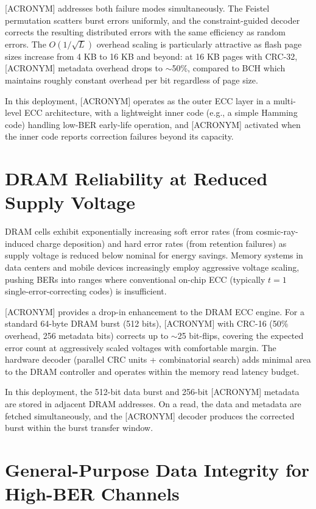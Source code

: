[ACRONYM] addresses both failure modes simultaneously. The Feistel permutation scatters burst errors uniformly, and the constraint-guided decoder corrects the resulting distributed errors with the same efficiency as random errors. The $O(1/\sqrt{L})$ overhead scaling is particularly attractive as flash page sizes increase from 4 KB to 16 KB and beyond: at 16 KB pages with CRC-32, [ACRONYM] metadata overhead drops to $\sim$50\%, compared to BCH which maintains roughly constant overhead per bit regardless of page size.

In this deployment, [ACRONYM] operates as the outer ECC layer in a multi-level ECC architecture, with a lightweight inner code (e.g., a simple Hamming code) handling low-BER early-life operation, and [ACRONYM] activated when the inner code reports correction failures beyond its capacity.

\section{DRAM Reliability at Reduced Supply Voltage}

DRAM cells exhibit exponentially increasing soft error rates (from cosmic-ray-induced charge deposition) and hard error rates (from retention failures) as supply voltage is reduced below nominal for energy savings. Memory systems in data centers and mobile devices increasingly employ aggressive voltage scaling, pushing BERs into ranges where conventional on-chip ECC (typically $t=1$ single-error-correcting codes) is insufficient.

[ACRONYM] provides a drop-in enhancement to the DRAM ECC engine. For a standard 64-byte DRAM burst (512 bits), [ACRONYM] with CRC-16 (50\% overhead, 256 metadata bits) corrects up to $\sim$25 bit-flips, covering the expected error count at aggressively scaled voltages with comfortable margin. The hardware decoder (parallel CRC units + combinatorial search) adds minimal area to the DRAM controller and operates within the memory read latency budget.

In this deployment, the 512-bit data burst and 256-bit [ACRONYM] metadata are stored in adjacent DRAM addresses. On a read, the data and metadata are fetched simultaneously, and the [ACRONYM] decoder produces the corrected burst within the burst transfer window.

\section{General-Purpose Data Integrity for High-BER Channels}

